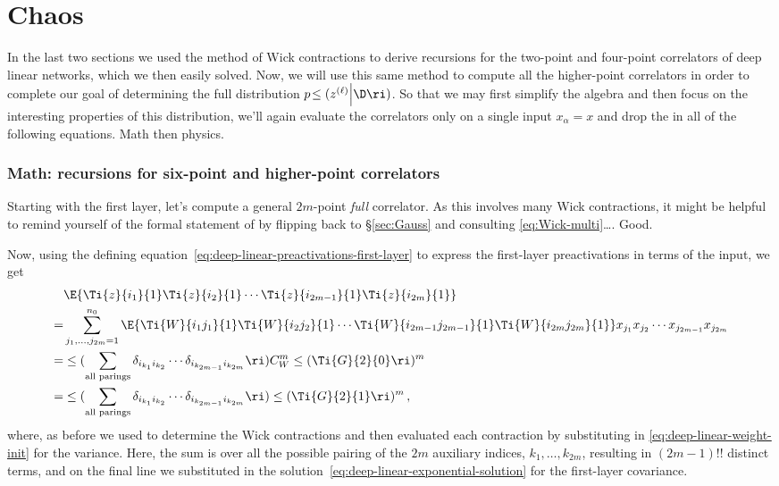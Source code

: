 \section{Chaos}\label{sec:solution_DLN}
In the last two sections we used the method of Wick contractions to derive recursions for the two-point and four-point correlators of deep linear networks, which we then easily solved. Now, we will use this same method 
to compute all the higher-point correlators
in order to complete our goal 
of determining the full distribution $p\!\le(z^{(\ell)}\Big| \D \ri)$. 
So that we may first simplify the algebra and then focus on the interesting properties of this distribution,
we'll again evaluate the correlators only on a single input $x_\alpha=x$
and drop the  in all of the following equations.
Math then physics.




\subsubsection{Math: recursions for six-point and higher-point correlators}
Starting with the first layer, let's compute a general $2m$-point \emph{full} correlator. As this involves many Wick contractions, it might be helpful to remind yourself of the formal statement of  by flipping back to \S\ref{sec:Gauss} and consulting \eqref{eq:Wick-multi}\ldots. Good.

Now, using the defining equation~\eqref{eq:deep-linear-preactivations-first-layer} to express the first-layer preactivations in terms of the input, we get
\begin{align}\label{eq:deep-linear-gaussian-first-layer}
&\E{\Ti{z}{i_1}{1}\Ti{z}{i_2}{1}\cdots \Ti{z}{i_{2m-1}}{1}\Ti{z}{i_{2m}}{1}} \\
\notag
=&\sum_{j_1,\ldots,j_{2m}=1}^{n_0}\E{\Ti{W}{i_1j_1}{1}\Ti{W}{i_2j_2}{1}\cdots\Ti{W}{i_{2m-1}j_{2m-1}}{1}\Ti{W}{i_{2m}j_{2m}}{1}}x_{j_1}x_{j_2}\cdots x_{j_{2m-1}}x_{j_{2m}} \\
\notag
=&\le( \sum_{\text{all parings}}\delta_{i_{k_1} i_{k_2}} \cdots \delta_{i_{k_{2m-1}}i_{k_{2m}}}\ri)C_W^m\le(\Ti{G}{2}{0}\ri)^m \,  \notag\\
=&\le( \sum_{\text{all parings}}\delta_{i_{k_1} i_{k_2}} \cdots \delta_{i_{k_{2m-1}}i_{k_{2m}}}\ri)\le(\Ti{G}{2}{1}\ri)^m \, , \notag
\end{align}
where, as before we used  to determine the Wick contractions and then evaluated each contraction by substituting in \eqref{eq:deep-linear-weight-init} for the variance. Here, the sum is over all the possible pairing of the $2m$ auxiliary indices, $k_1,\ldots, k_{2m}$, resulting in $(2m-1)!!$ distinct terms, and on the final line  we substituted in the solution~\eqref{eq:deep-linear-exponential-solution} for the first-layer covariance.

